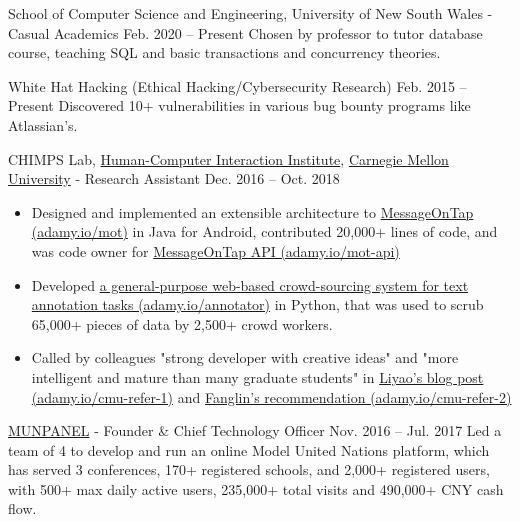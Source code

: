 \documentclass[hidelinks__VERSION__]{adamyi-cv}
\begin{document}
\begin{entrylist}


\entry
{School of Computer Science and Engineering, University of New South Wales - Casual Academics}
{Feb. 2020 -- Present}
{Chosen by professor to tutor database course, teaching SQL and basic transactions and concurrency theories.}


\entry
{White Hat Hacking (Ethical Hacking/Cybersecurity Research)}
{Feb. 2015 -- Present}
{Discovered 10+ vulnerabilities in various bug bounty programs like Atlassian's.}


\entry
{CHIMPS Lab, \href{https://www.hcii.cmu.edu/}{Human-Computer Interaction Institute}, \href{https://www.cmu.edu/}{Carnegie Mellon University} - Research Assistant}
{Dec. 2016 -- Oct. 2018}
{
\begin{minipage}[t]{1\linewidth}
\begin{itemize}[leftmargin=*,align=left,noitemsep]
\item Designed and implemented an extensible architecture to \href{https://adamy.io/mot}{MessageOnTap (adamy.io/mot)} in Java for Android, contributed 20,000+ lines of code, and was code owner for \href{https://adamy.io/mot-api}{MessageOnTap API (adamy.io/mot-api)}
\item Developed \href{https://adamy.io/annotator}{a general-purpose web-based crowd-sourcing system for text annotation tasks (adamy.io/annotator)} in Python, that was used to scrub 65,000+ pieces of data by 2,500+ crowd workers.
\item Called by colleagues "strong developer with creative ideas" and "more intelligent and mature than many graduate students" in \href{https://adamy.io/cmu-refer-1}{Liyao's blog post (adamy.io/cmu-refer-1)} and \href{https://adamy.io/cmu-refer-2}{Fanglin's recommendation (adamy.io/cmu-refer-2)}
\end{itemize}
\end{minipage}
}


\entry
{\href{https://www.munpanel.com}{MUNPANEL} - Founder \& Chief Technology Officer}
{Nov. 2016 -- Jul. 2017}
{Led a team of 4 to develop and run an online Model United Nations platform, which has served 3 conferences, 170+ registered schools, and 2,000+ registered users, with 500+ max daily active users, 235,000+ total visits and 490,000+ CNY cash flow.}


\end{entrylist}
\end{document}
